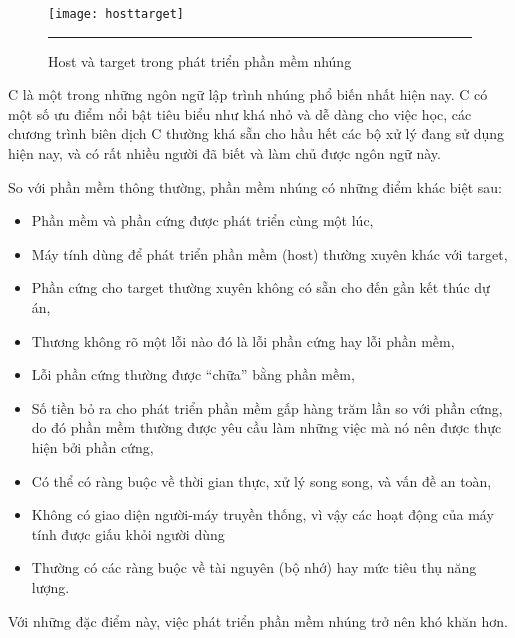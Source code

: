     
        
        \begin{figure}[H]
            \centering
            \texttt{[image: hosttarget]}
            \rule{35em}{0.5pt}
            \caption{Host và target trong phát triển phần mềm nhúng}
            \label{fig:hosttarget}
        \end{figure}

    C là một trong những ngôn ngữ lập trình nhúng phổ biến nhất hiện nay. C có một số ưu điểm nổi bật tiêu biểu như khá nhỏ và dễ dàng cho việc học, các chương trình biên dịch C thường khá sẵn cho hầu hết các bộ xử lý đang sử dụng hiện nay, và có rất nhiều người đã biết và làm chủ được ngôn ngữ này. 

 So với phần mềm thông thường, phần mềm nhúng có những điểm khác biệt sau:
    
    \begin{itemize}
        \item Phần mềm và phần cứng được phát triển cùng một lúc,
        \item Máy tính dùng để phát triển phần mềm (host) thường xuyên khác với target,
        \item Phần cứng cho target thường xuyên không có sẵn cho đến gần kết thúc dự án,
        \item Thương không rõ một lỗi nào đó là lỗi phần cứng hay lỗi phần mềm,
        \item Lỗi phần cứng thường được “chữa” bằng phần mềm,
        \item Số tiền bỏ ra cho phát triển phần mềm gấp hàng trăm lần so với phần cứng, do đó phần mềm thường được yêu cầu làm những việc mà nó nên được thực hiện bởi phần cứng,
        \item Có thể có ràng buộc về thời gian thực, xử lý song song, và vấn đề an toàn,
        \item Không có giao diện người-máy truyền thống, vì vậy các hoạt động của máy tính được giấu khỏi người dùng
        \item Thường có các ràng buộc về tài nguyên (bộ nhớ) hay mức tiêu thụ năng lượng.
    \end{itemize}

Với những đặc điểm này, việc phát triển phần mềm nhúng trở nên khó khăn hơn.
